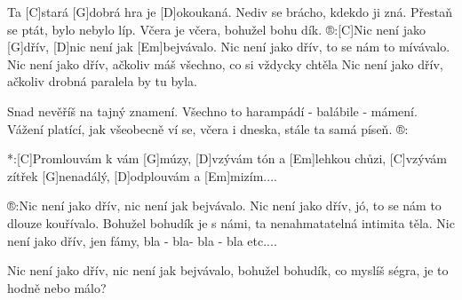 
Ta [C]stará [G]dobrá hra je [D]okoukaná.
Nediv se brácho, kdekdo ji zná.
Přestaň se ptát, bylo nebylo líp.
Včera je včera, bohužel bohu dík.
®:[C]Nic není jako [G]dřív, [D]nic není jak [Em]bejvávalo.
Nic není jako dřív, to se nám to mívávalo.
Nic není jako dřív, ačkoliv máš všechno,
co si vždycky chtěla
Nic není jako dřív, ačkoliv drobná paralela by tu byla.

Snad nevěříš na tajný znamení.
Všechno to harampádí - balábile - mámení.
Vážení platící, jak všeobecně ví se,
včera i dneska, stále ta samá píseň.
®:

*:[C]Promlouvám k vám [G] múzy,
[D]vzývám tón a [Em]lehkou chůzi,
[C]vzývám zítřek [G]nenadálý,
[D]odplouvám a [Em]mizím....

®:Nic není jako dřív, nic není jak bejvávalo.
Nic není jako dřív, jó, to se nám to dlouze kouřívalo.
Bohužel bohudík je s námi, ta nenahmatatelná intimita těla.
Nic není jako dřív, jen fámy,
bla - bla- bla - bla etc....

Nic není jako dřív, nic není jak bejvávalo,
bohužel bohudík, co myslíš ségra, je to hodně nebo málo?